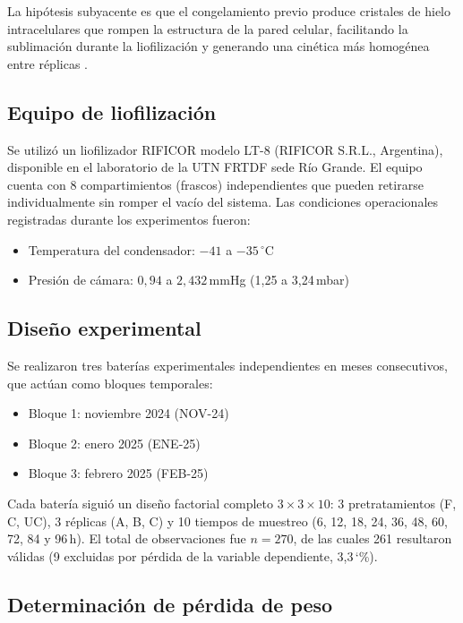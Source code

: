 \documentclass[12pt, a4paper]{article}
\newcommand{\pct}{\char`\%}
\begin{document}
La hipótesis subyacente es que el congelamiento previo produce cristales de hielo intracelulares que rompen la estructura de la pared celular, facilitando la sublimación durante la liofilización y generando una cinética más homogénea entre réplicas \citep{ratti2001}.

\subsection{Equipo de liofilización}

Se utilizó un liofilizador RIFICOR modelo LT-8 (RIFICOR S.R.L., Argentina), disponible en el laboratorio de la UTN FRTDF sede Río Grande. El equipo cuenta con 8 compartimientos (frascos) independientes que pueden retirarse individualmente sin romper el vacío del sistema. Las condiciones operacionales registradas durante los experimentos fueron:

\begin{itemize}
    \item Temperatura del condensador: $-41$ a $-35\,^\circ$C
    \item Presión de cámara: $0{,}94$ a $2{,}432$\,mmHg (1,25 a 3,24\,mbar)
\end{itemize}

\subsection{Diseño experimental}

Se realizaron tres baterías experimentales independientes en meses consecutivos, que actúan como bloques temporales:

\begin{itemize}
    \item Bloque 1: noviembre 2024 (NOV-24)
    \item Bloque 2: enero 2025 (ENE-25)
    \item Bloque 3: febrero 2025 (FEB-25)
\end{itemize}

Cada batería siguió un diseño factorial completo $3 \times 3 \times 10$: 3 pretratamientos (F, C, UC), 3 réplicas (A, B, C) y 10 tiempos de muestreo (6, 12, 18, 24, 36, 48, 60, 72, 84 y 96\,h). El total de observaciones fue $n = 270$, de las cuales 261 resultaron válidas (9 excluidas por pérdida de la variable dependiente, 3{,}3\,\pct{}).

\subsection{Determinación de pérdida de peso}
\end{document}
